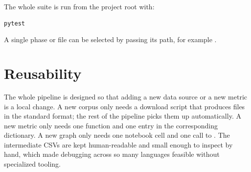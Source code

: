 The whole suite is run from the project root with:

\begin{lstlisting}
pytest
\end{lstlisting}

A single phase or file can be selected by passing its path, for example  .



\section{Reusability}

The whole pipeline is designed so that adding a new data source or a new metric is a local change. A new corpus only needs a download script that produces files in the standard  format; the rest of the pipeline picks them up automatically. A new metric only needs one function and one entry in the corresponding  dictionary. A new graph only needs one notebook cell and one call to . The intermediate CSVs are kept human-readable and small enough to inspect by hand, which made debugging across so many languages feasible without specialized tooling.